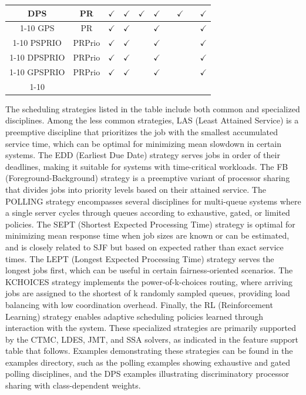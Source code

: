 \begin{table}[thbp]
{\begin{tabular}{|c|c|c|c|c|c|c|c|c|c|}
DPS	& PR	&	$\checkmark$	&$\checkmark$ &$\checkmark$	&  	$\checkmark$	&&  	 $\checkmark$ 	& 	&$\checkmark$  \\
\cline{1-10}
GPS	& PR	&$\checkmark$	&$\checkmark$ &  		&  	$\checkmark$  	& & 	& & $\checkmark$ \\
\cline{1-10}
PSPRIO	&  PRPrio	&$\checkmark$	&$\checkmark$ &	&  $\checkmark$		& &   	& 	& $\checkmark$	  \\
\cline{1-10}
DPSPRIO	& PRPrio	&$\checkmark$	&$\checkmark$ &	&  $\checkmark$		& &   	& 	& $\checkmark$	  \\
\cline{1-10}
GPSPRIO	& PRPrio	&$\checkmark$	&$\checkmark$ &	&  $\checkmark$		& &   	& 	& $\checkmark$	  \\
\cline{1-10}
\end{tabular}}
\label{TAB_solver_policies}
\end{table}

The scheduling strategies listed in the table include both common and specialized disciplines. Among the less common strategies, LAS (Least Attained Service) is a preemptive discipline that prioritizes the job with the smallest accumulated service time, which can be optimal for minimizing mean slowdown in certain systems. The EDD (Earliest Due Date) strategy serves jobs in order of their deadlines, making it suitable for systems with time-critical workloads. The FB (Foreground-Background) strategy is a preemptive variant of processor sharing that divides jobs into priority levels based on their attained service. The POLLING strategy encompasses several disciplines for multi-queue systems where a single server cycles through queues according to exhaustive, gated, or limited policies. The SEPT (Shortest Expected Processing Time) strategy is optimal for minimizing mean response time when job sizes are known or can be estimated, and is closely related to SJF but based on expected rather than exact service times. The LEPT (Longest Expected Processing Time) strategy serves the longest jobs first, which can be useful in certain fairness-oriented scenarios. The KCHOICES strategy implements the power-of-k-choices routing, where arriving jobs are assigned to the shortest of k randomly sampled queues, providing load balancing with low coordination overhead. Finally, the RL (Reinforcement Learning) strategy enables adaptive scheduling policies learned through interaction with the system. These specialized strategies are primarily supported by the CTMC, LDES, JMT, and SSA solvers, as indicated in the feature support table that follows. Examples demonstrating these strategies can be found in the examples directory, such as the polling examples showing exhaustive and gated polling disciplines, and the DPS examples illustrating discriminatory processor sharing with class-dependent weights.

